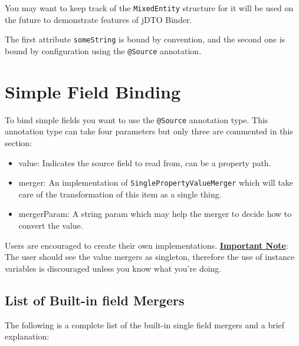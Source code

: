 \documentclass[11pt]{article}
\newcommand{\JDTO}{jDTO Binder\xspace}
\begin{document}
You may want to keep track of the \texttt{MixedEntity} structure for it will be used on the future
to demonstrate features of \JDTO.

The first attribute \texttt{someString} is bound by convention, and the second one is bound
by configuration using the \texttt{@Source} annotation.

\section{Simple Field Binding}


To bind simple fields you want to use the \texttt{@Source} annotation type.
This annotation type can take four parameters but only three are commented in this section:

\begin{itemize}
 \item value: Indicates the source field to read from, can be a property path.
 \item merger: An implementation of \texttt{SinglePropertyValueMerger} which will take care of the transformation of this item as a single thing.
 \item mergerParam: A string param which may help the merger to decide how to convert the value.
\end{itemize}

Users are encouraged to create their own implementations. \textbf{\underline{Important Note}}: The user should see
the value mergers as singleton, therefore the use of instance variables is discouraged unless you know what you're doing.


\subsection{List of Built-in field Mergers}


The following is a complete list of the built-in single field mergers and a brief explanation:
\end{document}
